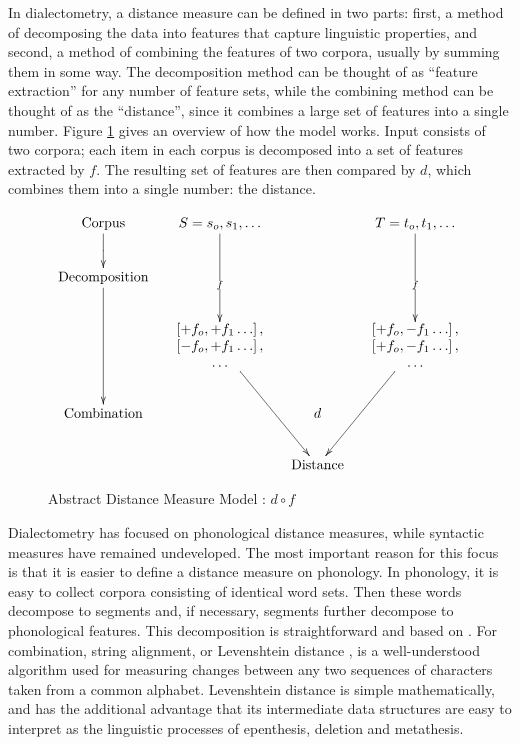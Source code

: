 In dialectometry, a distance measure can be defined in two parts:
first, a method of decomposing the data into features that capture
linguistic properties, and second, a method of combining the features
of two corpora, usually by summing them in some way. The decomposition
method can be thought of as ``feature extraction'' for any number of
feature sets, while the combining method can be thought of as the
``distance'', since it combines a large set of features into a single
number. Figure \ref{abstract-distance-measure-model} gives an overview
of how the model works. Input consists of two corpora; each item in
each corpus is decomposed into a set of features extracted by $f$. The
resulting set of features are then compared by $d$, which combines
them into a single number: the distance.

\begin{figure}
\[\xymatrix@C=1pc{
 \textrm{Corpus} \ar@{>}[d]|{} &
  S = s_o,s_1,\ldots
  \ar@{>}[dd]|{f}
  &&
  T = t_o,t_1,\ldots
  \ar@{>}[dd]|{f}
  \\
\textrm{Decomposition}\ar@{>}[dd] &&&\\
 &
 *{\begin{array}{c}
     \left[ + f_o, +f_1 \ldots \right], \\
     \left[ - f_o, +f_1 \ldots \right], \\
     \ldots \\ \end{array}}
 \ar@{>}[ddr]
 &&
 *{\begin{array}{c}
     \left[ + f_o, -f_1 \ldots \right], \\
     \left[ + f_o, -f_1 \ldots \right], \\
     \ldots \\ \end{array}}
 \ar@{>}[ddl]  \\
 \textrm{Combination} && d & \\
 & & \textrm{Distance} & \\
} \]
\label{abstract-distance-measure-model}
\caption{Abstract Distance Measure Model : $d \circ f$}
\end{figure}

Dialectometry has focused on phonological distance measures, while
syntactic measures have remained undeveloped. The most important
reason for this focus is that it is easier to define a distance
measure on phonology. In phonology, it is easy to collect corpora
consisting of identical word sets. Then these words decompose to segments and,
if necessary, segments further decompose to phonological
features. This decomposition is straightforward and based on
. For combination, string alignment, or Levenshtein
distance \cite{lev65}, is a well-understood algorithm used for
measuring changes between any two sequences of characters taken from a
common alphabet. Levenshtein distance is simple mathematically, and
has the additional advantage that its intermediate data structures are
easy to interpret as the linguistic processes of epenthesis, deletion and
metathesis.

